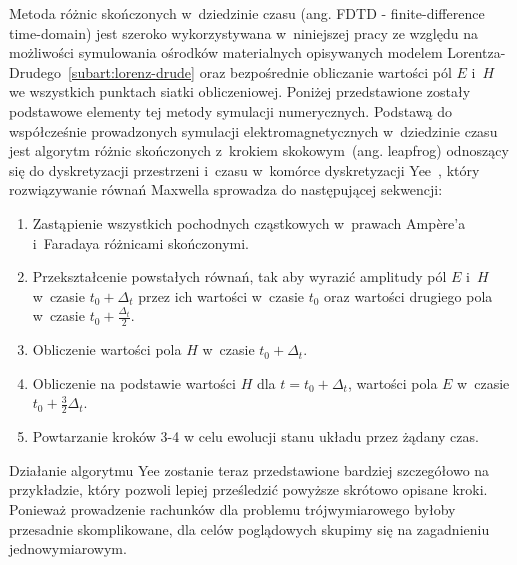 \label{subart:fdtd}
Metoda różnic skończonych w~dziedzinie czasu (ang. FDTD - finite-difference time-domain) jest szeroko wykorzystywana w~niniejszej pracy ze względu na możliwości symulowania ośrodków materialnych opisywanych modelem Lorentza-Drudego~\ref{subart:lorenz-drude} oraz bezpośrednie obliczanie wartości pól $E$ i~$H$ we wszystkich punktach siatki obliczeniowej. Poniżej przedstawione zostały podstawowe elementy tej metody symulacji numerycznych. Podstawą do współcześnie prowadzonych symulacji elektromagnetycznych w~dziedzinie czasu jest algorytm różnic skończonych z~krokiem skokowym~(ang. leapfrog)  odnoszący się do dyskretyzacji przestrzeni i~czasu w~komórce dyskretyzacji Yee~\cite{1966ITAP14302Y}, który rozwiązywanie równań Maxwella sprowadza do następującej sekwencji:
\begin{enumerate}
\item Zastąpienie wszystkich pochodnych cząstkowych w~prawach Amp\`{e}re'a i~Faradaya różnicami skończonymi.
\item Przekształcenie powstałych równań, tak aby wyrazić amplitudy pól $E$ i~$H$ w~czasie $t_0 +  \Delta_t$ przez ich wartości w~czasie $t_0$ oraz wartości drugiego pola w~czasie $t_0+ \frac{\Delta_t}{2}$.
\item Obliczenie wartości pola $H$ w~czasie $t_0 +  \Delta_t$.
\item Obliczenie na podstawie wartości $H$ dla $t=t_0+  \Delta_t$, wartości pola $E$ w~czasie $t_0 + \frac{3}{2} \Delta_t$.
\item Powtarzanie kroków 3-4 w celu ewolucji stanu układu przez żądany czas.
\end{enumerate}
Działanie algorytmu Yee zostanie teraz przedstawione bardziej szczegółowo na przykładzie, który pozwoli lepiej prześledzić powyższe skrótowo opisane kroki. Ponieważ prowadzenie rachunków dla problemu trójwymiarowego byłoby przesadnie skomplikowane, dla celów poglądowych skupimy się na zagadnieniu jednowymiarowym.

